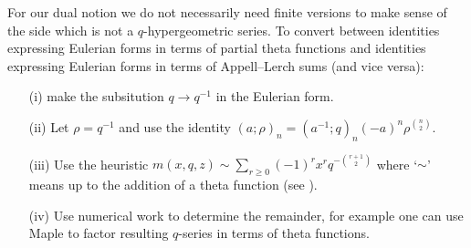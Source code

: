 \documentclass[12pt,reqno]{amsart}
\theoremstyle{remark}
\theoremstyle{definition}
\numberwithin{theorem}{section} \numberwithin{equation}{section}
\numberwithin{example}{section}
\begin{document}
For our dual notion we do not necessarily need finite versions to make sense of the side which is not a $q$-hypergeometric series.  To convert between identities expressing Eulerian forms in terms of  partial theta functions and identities expressing Eulerian forms in terms of Appell--Lerch sums (and vice versa): 

\begin{itemize}
\item[(i)] make the subsitution $q\rightarrow q^{-1}$ in the Eulerian form. 

\item[(ii)] Let $\rho=q^{-1}$ and use the identity $(a;\rho)_{n}=(a^{-1};q)_n(-a)^{n}\rho^{\binom{n}{2}}.$

\item[(iii)] Use the heuristic $m(x,q,z)\sim \sum_{r\ge 0}(-1)^rx^rq^{-\binom{r+1}{2}}$ where `$\sim$' means up to the addition of a theta function (see \cite[Section 2]{HM}).

\item[(iv)] Use numerical work to determine the remainder, for example one can use Maple to factor resulting $q$-series in terms of theta functions.
\end{itemize}
\end{document}
